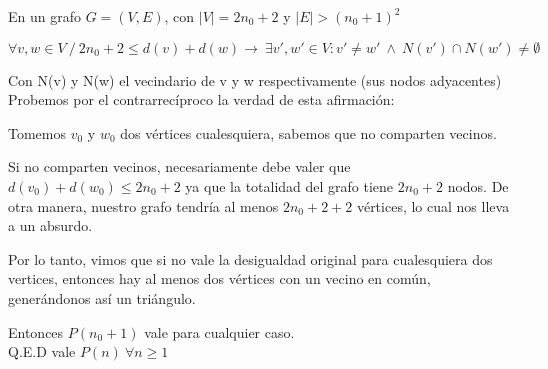 \documentclass{article}
\begin{document}
En un grafo \( G = (V,E) \), con \( |V| = 2n_0 + 2 \) y \( |E| > (n_0 + 1)^2 \)

\[
 \forall v,w \in V \ / \ 2n_0 + 2 \leq d(v) + d(w)  \rightarrow  \ \exists v',w' \in V :   v' \neq  w' \ \land \  N(v') \cap N(w') \neq \emptyset
\]

Con N(v) y N(w) el vecindario de v y w respectivamente (sus nodos adyacentes)\\
Probemos por el contrarrecíproco la verdad de esta afirmación:

Tomemos \( v_0 \) y \( w_0 \) dos vértices cualesquiera, sabemos que no comparten vecinos.

Si no comparten vecinos, necesariamente debe valer que \( d(v_0) + d(w_0) \leq 2n_0 + 2 \) ya que la totalidad del grafo tiene \( 2n_0 + 2 \) nodos. De otra manera, nuestro grafo tendría al menos \( 2n_0 + 2 + 2 \) vértices, lo cual nos lleva a un absurdo.

Por lo tanto, vimos que si no vale la desigualdad original para cualesquiera dos vertices, entonces hay al menos dos vértices con un vecino en común, generándonos así un triángulo. 

Entonces \( P(n_0 + 1) \) vale para cualquier caso.\\

Q.E.D vale \( P(n) \ \forall n \geq 1 \)
\end{document}

